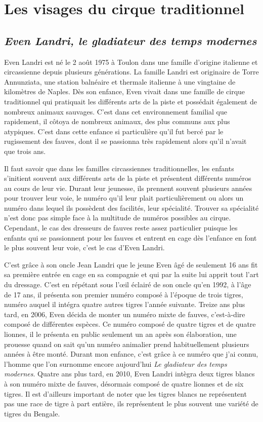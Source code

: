 \chapter{Les visages du cirque traditionnel}
\section*{\textit{Even Landri, le gladiateur des temps modernes}}
{}
\noindent
Even Landri est né le 2 août 1975 à Toulon dans une famille d'origine italienne et circassienne depuis plusieurs générations. La famille Landri est originaire de Torre Annunziata, une station balnéaire et thermale italienne à une vingtaine de kilomètres de Naples. Dès son enfance, Even vivait dans une famille de cirque traditionnel qui pratiquait les différents arts de la piste et possédait également de nombreux animaux sauvages. C'est dans cet environnement familial que rapidement, il côtoya de nombreux animaux, des plus communs aux plus atypiques. C'est dans cette enfance si particulière qu'il fut bercé par le rugissement des fauves, dont il se passionna très rapidement alors qu'il n'avait que trois ans.

Il faut savoir que dans les familles circassiennes traditionnelles, les enfants s'initient souvent aux différents arts de la piste et présentent différents numéros au cours de leur vie. Durant leur jeunesse, ils prennent souvent plusieurs années pour trouver leur voie, le numéro qu'il leur plait particulièrement ou alors un numéro dans lequel ils possèdent des facilités, leur spécialité. Trouver sa spécialité n'est donc pas simple face à la multitude de numéros possibles au cirque. Cependant, le cas des dresseurs de fauves reste assez particulier puisque les enfants qui se passionnent pour les fauves et entrent en cage dès l'enfance en font le plus souvent leur voie, c'est le cas d'Even Landri. 

C'est grâce à son oncle Jean Landri que le jeune Even âgé de seulement 16 ans fit sa première entrée en cage en sa compagnie et qui par la suite lui apprit tout l'art du dressage. C'est en répétant sous l'œil éclairé de son oncle qu’en 1992, à l'âge de 17 ans, il présenta son premier numéro composé à l'époque de trois tigres, numéro auquel il intégra quatre autres tigres l'année suivante. Treize ans plus tard, en 2006, Even décida de monter un numéro mixte de fauves, c’est-à-dire composé de différentes espèces. Ce numéro composé de quatre tigres et de quatre lionnes, il le présenta en public seulement un an après son élaboration, une prouesse quand on sait qu'un numéro animalier prend habituellement plusieurs années à être monté. Durant mon enfance, c'est grâce à ce numéro que j'ai connu, l'homme que l'on surnomme encore aujourd'hui \textit{Le gladiateur des temps modernes}. Quatre ans plus tard, en 2010, Even Landri intègra deux tigres blancs à son numéro mixte de fauves, désormais composé de quatre lionnes et de six tigres. Il est d'ailleurs important de noter que les tigres blancs ne représentent pas une race de tigre à part entière, ils représentent le plus souvent une variété de tigres du Bengale. 

